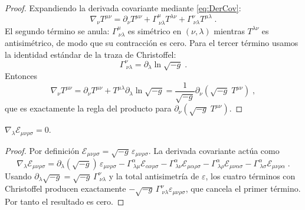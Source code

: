             \begin{proof}
                Expandiendo la derivada covariante mediante \eqref{eq:DerCov}:
                \begin{equation*}
                    \nabla_{\nu}T^{\mu\nu}
                        = \partial_{\nu}T^{\mu\nu}
                        + \Gamma^{\mu}_{\ \nu\lambda}T^{\lambda\nu}
                        + \Gamma^{\nu}_{\ \nu\lambda}T^{\mu\lambda}\;.
                \end{equation*}
                El segundo término se anula: $\Gamma^{\mu}_{\ \nu\lambda}$ es simétrico en $(\nu,\lambda)$ mientras $T^{\lambda\nu}$ es antisimétrico, de modo que su contracción es cero.  Para el tercer término usamos la identidad estándar de la traza de Christoffel:
                \begin{equation*}
                    \Gamma^{\nu}_{\ \nu\lambda}
                        = \partial_{\lambda}\ln\sqrt{-g}\;.
                \end{equation*}
                Entonces
                \begin{equation*}
                    \nabla_{\nu}T^{\mu\nu}
                        = \partial_{\nu}T^{\mu\nu}
                        + T^{\mu\lambda}\partial_{\lambda}\ln\sqrt{-g}
                        = \frac{1}{\sqrt{-g}}
                        \partial_{\nu}\!\left(\sqrt{-g}\;T^{\mu\nu}\right)\;,
                \end{equation*}
                que es exactamente la regla del producto para $\partial_{\nu}(\sqrt{-g}\;T^{\mu\nu})$.
            \end{proof}

            \begin{myteo}
                \label{teo:NablaLC}
                $\nabla_{\lambda}\mathcal{E}_{\mu\nu\rho\sigma} = 0$.
            \end{myteo}

            \begin{proof}
                Por definición $\mathcal{E}_{\mu\nu\rho\sigma}=\sqrt{-g}\,\varepsilon_{\mu\nu\rho\sigma}$.  La derivada covariante actúa como
                \begin{equation*}
                    \nabla_{\lambda}\mathcal{E}_{\mu\nu\rho\sigma}
                        = \partial_{\lambda}(\sqrt{-g})\,\varepsilon_{\mu\nu\rho\sigma}
                        - \Gamma^{\alpha}_{\ \lambda\mu}\mathcal{E}_{\alpha\nu\rho\sigma}
                        - \Gamma^{\alpha}_{\ \lambda\nu}\mathcal{E}_{\mu\alpha\rho\sigma}
                        - \Gamma^{\alpha}_{\ \lambda\rho}\mathcal{E}_{\mu\nu\alpha\sigma}
                        - \Gamma^{\alpha}_{\ \lambda\sigma}\mathcal{E}_{\mu\nu\rho\alpha}\;.
                \end{equation*}
                Usando $\partial_{\lambda}\sqrt{-g}=\sqrt{-g}\,\Gamma^{\nu}_{\ \nu\lambda}$ y la total antisimetría de $\varepsilon$, los cuatro términos con Christoffel producen exactamente $-\sqrt{-g}\,\Gamma^{\nu}_{\ \nu\lambda} \varepsilon_{\mu\nu\rho\sigma}$, que cancela el primer término. Por tanto el resultado es cero.
            \end{proof}


